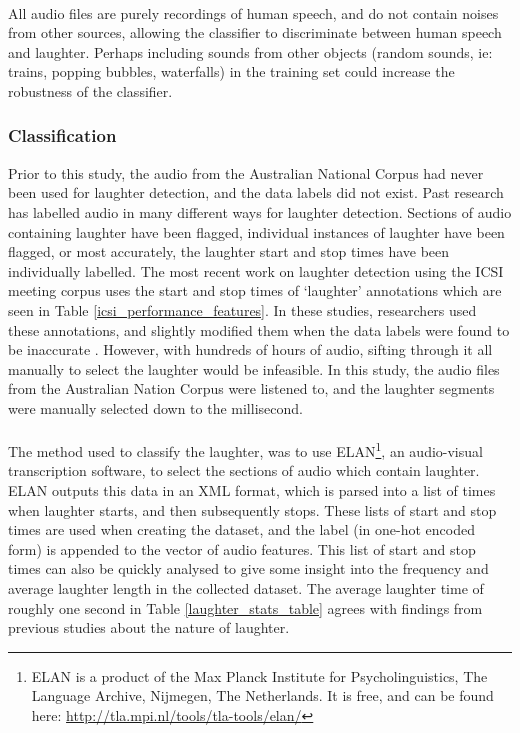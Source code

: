 \documentclass[a4paper,11pt,notitlepage]{article}
\begin{document}
\\
All audio files are purely recordings of human speech, and do not contain noises from other sources, allowing the classifier to discriminate between human speech and laughter. Perhaps including sounds from other objects (random sounds, ie: trains, popping bubbles, waterfalls) in the training set could increase the robustness of the classifier.

\subsubsection{Classification}

Prior to this study, the audio from the Australian National Corpus had never been used for laughter detection, and the data labels did not exist. Past research has labelled audio in many different ways for laughter detection. Sections of audio containing laughter have been flagged, individual instances of laughter have been flagged, or most accurately, the laughter start and stop times have been individually labelled. The most recent work on laughter detection using the ICSI meeting corpus uses the start and stop times of `laughter' annotations which are seen in Table \ref{icsi_performance_features}. In these studies, researchers used these annotations, and slightly modified them when the data labels were found to be inaccurate \cite{knox2007automatic}. However, with hundreds of hours of audio, sifting through it all manually to select the laughter would be infeasible. In this study, the audio files from the Australian Nation Corpus were listened to, and the laughter segments were manually selected down to the millisecond.\\
\\
The method used to classify the laughter, was to use ELAN\footnote{ELAN is a product of the Max Planck Institute for Psycholinguistics, The Language Archive, Nijmegen, The Netherlands. It is free, and can be found here: \url{http://tla.mpi.nl/tools/tla-tools/elan/}}\cite{sloetjes2008annotation}, an audio-visual transcription software, to select the sections of audio which contain laughter. ELAN outputs this data in an XML format, which is parsed into a list of times when laughter starts, and then subsequently stops. These lists of start and stop times are used when creating the dataset, and the label (in one-hot encoded form) is appended to the vector of audio features. This list of start and stop times can also be quickly analysed to give some insight into the frequency and average laughter length in the collected dataset. The average laughter time of roughly one second in Table \ref{laughter_stats_table} agrees with findings from previous studies about the nature of laughter.\cite{bachorowski2001acoustic}\\
\end{document}
